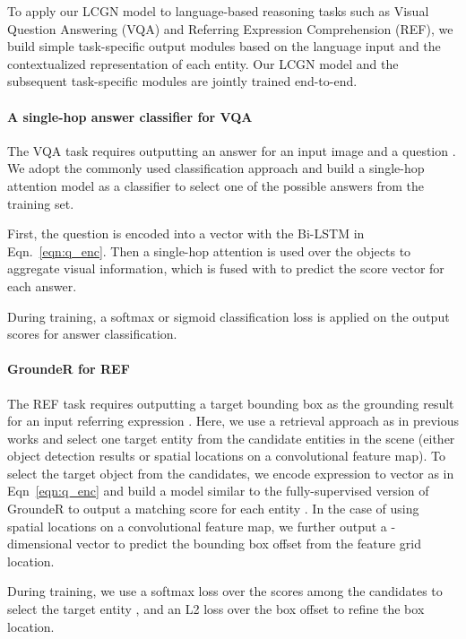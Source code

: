 \documentclass[10pt,twocolumn,letterpaper]{article}
\begin{document}
To apply our LCGN model to language-based reasoning tasks such as Visual Question Answering (VQA) and Referring Expression Comprehension (REF), we build simple task-specific output modules based on the language input and the contextualized representation of each entity. Our LCGN model and the subsequent task-specific modules are jointly trained end-to-end.

\vspace{-1em}
\paragraph{A single-hop answer classifier for VQA} The VQA task requires outputting an answer for an input image  and a question . We adopt the commonly used classification approach and build a single-hop attention model as a classifier to select one of the possible answers from the training set.

First, the question  is encoded into a vector  with the Bi-LSTM in Eqn.~\ref{eqn:q_enc}. Then a single-hop attention  is used over the objects to aggregate visual information, which is fused with  to predict the score vector  for each answer.

During training, a softmax or sigmoid classification loss is applied on the output scores  for answer classification.

\vspace{-1em}
\paragraph{GroundeR \cite{rohrbach2016grounding} for REF} The REF task requires outputting a target bounding box as the grounding result for an input referring expression . Here, we use a retrieval approach as in previous works and select one target entity from the  candidate entities in the scene (either object detection results or spatial locations on a convolutional feature map). To select the target object  from the  candidates, we encode expression  to vector  as in Eqn~\ref{eqn:q_enc} and build a model similar to the fully-supervised version of GroundeR \cite{rohrbach2016grounding} to output a matching score  for each entity . 
In the case of using spatial locations on a convolutional feature map, we further output a -dimensional vector  to predict the bounding box offset from the feature grid location.

During training, we use a softmax loss over the scores  among the  candidates to select the target entity , and an L2 loss over the box offset  to refine the box location.
\end{document}
